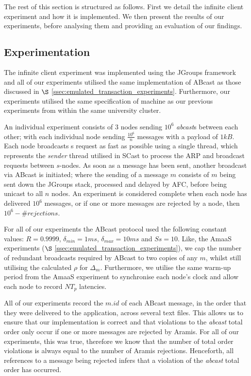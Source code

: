     The rest of this section is structured as follows.  First we detail the infinite client experiment and how it is implemented.  We then present the results of our experiments, before analysing them and providing an evaluation of our findings. 
    
    \subsection{Experimentation}\label{ssec: infinite_experimentation}
    The infinite client experiment was implemented using the JGroups framework and all of our experiments utilised the same implementation of \textsf{ABcast} as those discussed in $\S$ \ref{ssec:emulated_transaction_experiments}.  Furthermore, our experiments utilised the same specification of machine as our previous experiments from within the same university cluster.  
    
    An individual experiment consists of $3$ nodes sending $10^6$ \emph{abcast}s between each other; with each individual node sending $\frac{10^6}{n}$ messages with a payload of $1kB$.  Each node broadcasts s request as fast as possible using a single thread, which represents the \emph{sender} thread utilised in \textsf{SCast} to process the ARP and broadcast requests between $s$-nodes.  As soon as a message has been sent, another broadcast via \textsf{ABcast} is initiated; where the sending of a message $m$ consists of $m$ being sent down the JGroups stack, processed and delayed by AFC, before being unicast to all $n$ nodes.  An experiment is considered complete when each node has delivered $10^6$ messages, or if one or more messages are rejected by a node, then $10^6 - \#rejections$.  
    
    For all of our experiments the \textsf{ABcast} protocol used the following constant values: $R = 0.9999$, $\delta_{min} = 1ms$, $\delta_{max} = 10ms$ and $Ss = 10$.  Like, the \textsf{AmaaS} experiments ($\S$ \ref{ssec:emulated_transaction_experiments}), we cap the number of redundant broadcasts required by \textsf{ABcast} to two copies of any $m$, whilst still utilising the calculated $\rho$ for $\Delta_m$.  Furthermore, we utilise the same warm-up period from the \textsf{AmaaS} experiment to synchronise each node's clock and allow each node to record $NT_p$ latencies.  
    
    All of our experiments record the $m.id$ of each \textsf{ABcast} message, in the order that they were delivered to the application, across several text files.  This allows us to ensure that our implementation is correct and that violations to the \emph{abcast} total order only occur if one or more messages are rejected by \textsf{Aramis}.  For all of our experiments, this was true, therefore we know that the number of total order violations is always equal to the number of \textsf{Aramis} rejections.  Henceforth, all references to a message being rejected infers that a violation of the \emph{abcast} total order has occurred.  
    
